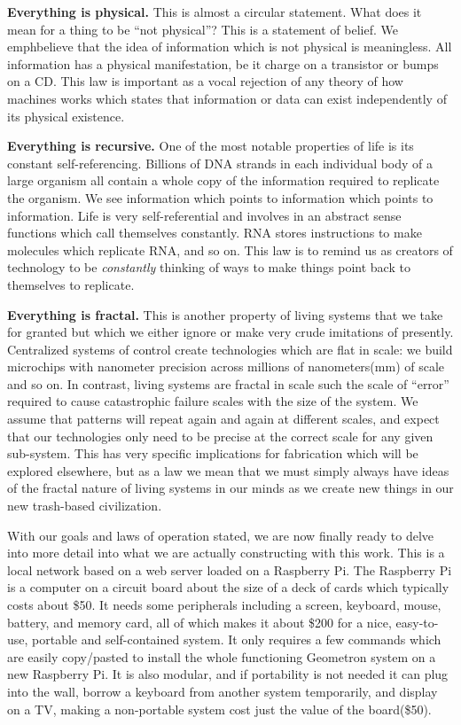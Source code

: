 \textbf{Everything is physical.}  This is almost a circular statement.  What does it mean for a thing to be ``not physical''?  This is a statement of belief.  We emph{believe} that the idea of information which is not physical is meaningless.  All information has a physical manifestation, be it charge on a transistor or bumps on a CD.  This law is important as a vocal rejection of any theory of how machines works which states that information or data can exist independently of its physical existence.

\textbf{Everything is recursive.}  One of the most notable properties of life is its constant self-referencing.  Billions of DNA strands in each individual body of a large organism all contain a whole copy of the information required to replicate the organism.  We see information which points to information which points to information.  Life is very self-referential and involves in an abstract sense functions which call themselves constantly.  RNA stores instructions to make molecules which replicate RNA, and so on.   This law is to remind us as creators of technology to be \emph{constantly} thinking of ways to make things point back to themselves to replicate. 

\textbf{Everything is fractal.}  This is another property of living systems that we take for granted but which we either ignore or make very crude imitations of presently.  Centralized systems of control create technologies which are flat in scale: we build microchips with nanometer precision across millions of nanometers(mm) of scale and so on.  In contrast, living systems are fractal in scale such the scale of ``error'' required to cause catastrophic failure scales with the size of the system.  We assume that patterns will repeat again and again at different scales, and expect that our technologies only need to be precise at the correct scale for any given sub-system.  This has very specific implications for fabrication which will be explored elsewhere, but as a law we mean that we must simply always have ideas of the fractal nature of living systems in our minds as we create new things in our new trash-based civilization.


With our goals and laws of operation stated, we are now finally ready to delve into more detail into what we are actually constructing with this work.  This is a local network based on a web server loaded on a Raspberry Pi.  The Raspberry Pi is a computer on a circuit board about the size of a deck of cards which typically costs about \$50.  It needs some peripherals including a screen, keyboard, mouse, battery, and memory card, all of which makes it about \$200 for a nice, easy-to-use, portable and self-contained system.  It only requires a few commands which are easily copy/pasted to install the whole functioning Geometron system on a new Raspberry Pi.  It is also modular, and if portability is not needed it can plug into the wall, borrow a keyboard from another system temporarily, and display on a TV, making a non-portable system cost just the value of the board(\$50).  

